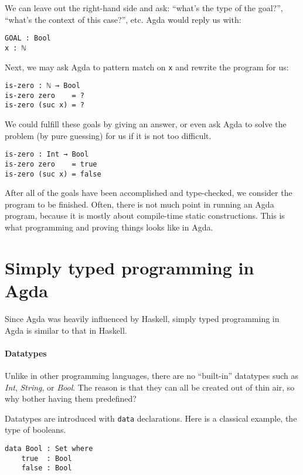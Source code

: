 \documentclass[\main/thesis.tex]{subfiles}
\begin{document}
We can leave out the right-hand side and ask:
``what's the type of the goal?'', ``what's the context of this case?'', etc.
Agda would reply us with:

\begin{lstlisting}
GOAL : Bool
x : ℕ
\end{lstlisting}

Next, we may ask Agda to pattern match on {\lstinline|x|} and rewrite the program for us:

\begin{lstlisting}
is-zero : ℕ → Bool
is-zero zero    = ?
is-zero (suc x) = ?
\end{lstlisting}

We could fulfill these goals by giving an answer,
or even ask Agda to solve the problem (by pure guessing) for us if it is not too difficult.

\begin{lstlisting}
is-zero : Int → Bool
is-zero zero    = true
is-zero (suc x) = false
\end{lstlisting}

After all of the goals have been accomplished and type-checked,
we consider the program to be finished.
Often, there is not much point in running an Agda program,
because it is mostly about compile-time static constructions.
This is what programming and proving things looks like in Agda.

\section{Simply typed programming in Agda}

Since Agda was heavily influenced by Haskell, simply typed programming in Agda
is similar to that in Haskell.

\paragraph{Datatypes}


Unlike in other programming languages, there are no ``built-in''
datatypes such as \textit{Int}, \textit{String}, or \textit{Bool}.
The reason is that they can all be created out of thin air, so why
bother having them predefined?

Datatypes are introduced with {\lstinline|data|} declarations.
Here is a classical example, the type of booleans.

\begin{lstlisting}
data Bool : Set where
    true  : Bool
    false : Bool
\end{lstlisting}
\end{document}

